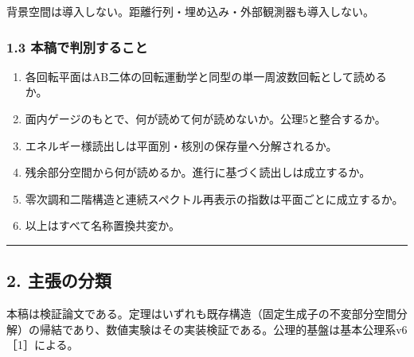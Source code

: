 \documentclass[
  a4paper,
]{ltjsarticle}
\providecommand{\tightlist}{%
  \setlength{\itemsep}{0pt}\setlength{\parskip}{0pt}}
\begin{document}
背景空間は導入しない。距離行列・埋め込み・外部観測器も導入しない。

\subsubsection{1.3
本稿で判別すること}\label{ux672cux7a3fux3067ux5224ux5225ux3059ux308bux3053ux3068}

\begin{enumerate}
\def\labelenumi{\arabic{enumi}.}
\tightlist
\item
  各回転平面はAB二体の回転運動学と同型の単一周波数回転として読めるか。
\item
  面内ゲージのもとで、何が読めて何が読めないか。公理5と整合するか。
\item
  エネルギー様読出しは平面別・核別の保存量へ分解されるか。
\item
  残余部分空間から何が読めるか。進行に基づく読出しは成立するか。
\item
  零次調和二階構造と連続スペクトル再表示の指数は平面ごとに成立するか。
\item
  以上はすべて名称置換共変か。
\end{enumerate}

\begin{center}\rule{0.5\linewidth}{0.5pt}\end{center}

\subsection{2. 主張の分類}\label{ux4e3bux5f35ux306eux5206ux985e}

本稿は検証論文である。定理はいずれも既存構造（固定生成子の不変部分空間分解）の帰結であり、数値実験はその実装検証である。公理的基盤は基本公理系v6［1］による。
\end{document}
